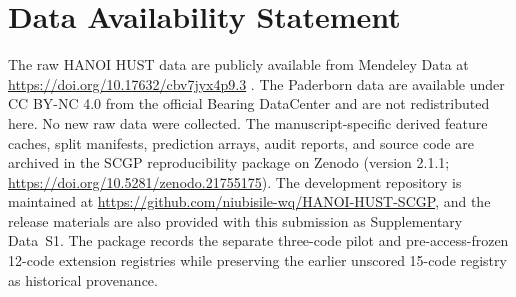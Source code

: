 \documentclass[machines,article,submit,oneauthor,pdftex]{Definitions/mdpi}
\begin{document}
\section*{Data Availability Statement}
The raw HANOI HUST data are publicly available from Mendeley Data at \url{https://doi.org/10.17632/cbv7jyx4p9.3} \cite{r45}. The Paderborn data are available under CC BY-NC 4.0 from the official Bearing DataCenter \cite{r43,r46} and are not redistributed here. No new raw data were collected. The manuscript-specific derived feature caches, split manifests, prediction arrays, audit reports, and source code are archived in the SCGP reproducibility package on Zenodo (version 2.1.1; \url{https://doi.org/10.5281/zenodo.21755175}). The development repository is maintained at \url{https://github.com/niubisile-wq/HANOI-HUST-SCGP}, and the release materials are also provided with this submission as Supplementary Data~S1. The package records the separate three-code pilot and pre-access-frozen 12-code extension registries while preserving the earlier unscored 15-code registry as historical provenance.
\end{document}
